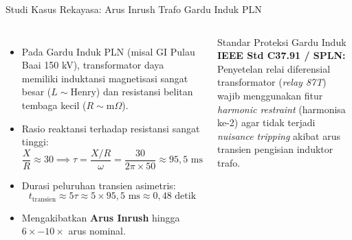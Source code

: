 \documentclass[aspectratio=169,10pt]{beamer}
\begin{document}
\begin{frame}{Studi Kasus Rekayasa: Arus Inrush Trafo Gardu Induk PLN}
  \begin{columns}
    \begin{itemize}
      \item Pada Gardu Induk PLN (misal GI Pulau Baai 150 kV), transformator daya memiliki induktansi magnetisasi sangat besar ($L \sim \text{Henry}$) dan resistansi belitan tembaga kecil ($R \sim \text{m}\Omega$).
      \item Rasio reaktansi terhadap resistansi sangat tinggi:
      \begin{equation*}
        \frac{X}{R} \approx 30 \implies \tau = \frac{X/R}{\omega} = \frac{30}{2\pi \times 50} \approx 95{,}5\text{ ms}
      \end{equation*}
      \item Durasi peluruhan transien asimetris:
      \begin{equation*}
        t_{\text{transien}} \approx 5\tau \approx 5 \times 95{,}5\text{ ms} \approx 0{,}48\text{ detik}
      \end{equation*}
      \item Mengakibatkan \textbf{Arus Inrush} hingga $6\times - 10\times$ arus nominal.
    \end{itemize}

    \begin{block}{Standar Proteksi Gardu Induk}
      \textbf{IEEE Std C37.91 / SPLN:}
      Penyetelan relai diferensial transformator (\textit{relay 87T}) wajib menggunakan fitur \textit{harmonic restraint} (harmonisa ke-2) agar tidak terjadi \textit{nuisance tripping} akibat arus transien pengisian induktor trafo.
    \end{block}
  \end{columns}
\end{frame}
\end{document}
